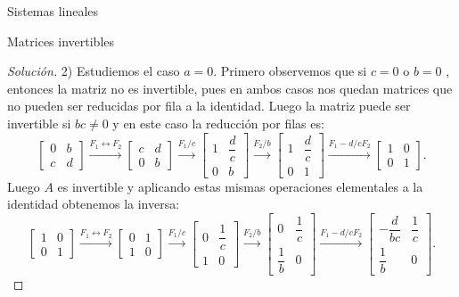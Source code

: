 \documentclass[a4paper,12pt,twoside,spanish,reqno]{amsbook}
\theoremstyle{definition}
\theoremstyle{remark}
\begin{document}
\begin{chapter}{Sistemas lineales}
\begin{section}{Matrices invertibles}
\begin{proof}[Solución]
				2) Estudiemos el caso $a=0$. Primero observemos que si $c=0$ o $b=0$ , entonces la matriz no es invertible, pues en ambos casos nos quedan matrices que no pueden ser reducidas por fila a la identidad. Luego la matriz puede ser invertible si $bc\not=0$ y en este caso la reducción por filas es:
				\begin{equation*}
				\begin{bmatrix}0&b\\c&d\end{bmatrix} \stackrel{F_1\leftrightarrow F_2}{\longrightarrow}
				\begin{bmatrix}c&d\\0&b\end{bmatrix} \stackrel{F_1/c}{\longrightarrow}
				\begin{bmatrix}1&\dfrac{d}{c}\\[6pt]0&b\end{bmatrix} \stackrel{F_2/b}{\longrightarrow}
				\begin{bmatrix}1&\dfrac{d}{c}\\[6pt]0&1\end{bmatrix}
				\stackrel{F_1 - d/c F_2}{\longrightarrow}
				\begin{bmatrix}1&0\\0&1\end{bmatrix}.
				\end{equation*}   
				Luego $A$  es invertible y aplicando estas mismas operaciones elementales a la identidad  obtenemos la inversa:
				\begin{equation*}
				\begin{bmatrix}1&0\\0&1\end{bmatrix} \stackrel{F_1\leftrightarrow F_2}{\longrightarrow}
				\begin{bmatrix}0&1\\1&0\end{bmatrix} \stackrel{F_1/c}{\longrightarrow}
				\begin{bmatrix}0&\dfrac{1}{c}\\[6pt]1&0\end{bmatrix} \stackrel{F_2/b}{\longrightarrow}
				\begin{bmatrix}0&\dfrac{1}{c}\\[6pt]\dfrac{1}{b}&0\end{bmatrix}
				\stackrel{F_1 - d/c F_2}{\longrightarrow}
				\begin{bmatrix}-\dfrac{d}{bc}&\dfrac{1}{c}\\[6pt]\dfrac{1}{b}&0\end{bmatrix}.

\end{equation*}
\end{proof}
\end{section}
\end{chapter}
\end{document}
